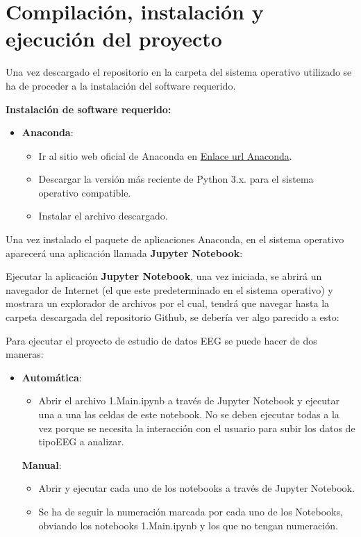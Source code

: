 \section{Compilación, instalación y ejecución del proyecto}


Una vez descargado el repositorio en la carpeta del sistema operativo utilizado se ha de proceder a la instalación del software requerido. 

\textbf{Instalación de software requerido:} 
  \begin{itemize}
   \tightlist
   \item
    \textbf{Anaconda}: 
    \begin{itemize}
   \tightlist
   \item
    Ir al sitio web oficial de Anaconda en \href{https://www.anaconda.com/download/success}{Enlace url Anaconda}. 
   \item
    Descargar la versión más reciente de Python 3.x. para el sistema operativo compatible.
   \item
   Instalar el archivo descargado.
   \end{itemize}
  \end{itemize}  


Una vez instalado el paquete de aplicaciones Anaconda, en el sistema operativo aparecerá una aplicación llamada \textbf{Jupyter Notebook}:

Ejecutar la aplicación \textbf{Jupyter Notebook}, una vez iniciada, se abrirá un navegador de Internet (el que este predeterminado en el sistema operativo) y mostrara un explorador de archivos por el cual, tendrá que navegar hasta la carpeta descargada del repositorio Github, se debería ver algo parecido a esto:




Para ejecutar el proyecto de estudio de datos EEG se puede hacer de dos maneras:

  \begin{itemize}
   \tightlist
   \item
    \textbf{Automática}: 
    \begin{itemize}
   \tightlist
   \item
    Abrir el archivo 1.Main.ipynb a través de Jupyter Notebook y ejecutar una a una las celdas de este notebook. No se deben ejecutar todas a la vez porque se necesita la interacción con el usuario para subir los datos de tipoEEG a analizar.
   \end{itemize}

    \textbf{Manual}: 
    \begin{itemize}
   \tightlist
   \item
    Abrir y ejecutar cada uno de los notebooks a través de Jupyter Notebook. 
   \item
    Se ha de seguir la numeración marcada por cada uno de los Notebooks, obviando los notebooks 1.Main.ipynb y los que no tengan numeración.
   \end{itemize}   
   
  \end{itemize}  


